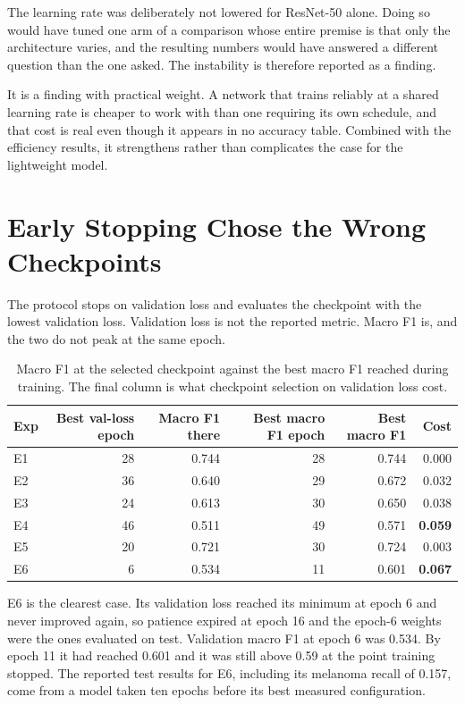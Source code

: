 The learning rate was deliberately not lowered for ResNet-50 alone. Doing so would have
tuned one arm of a comparison whose entire premise is that only the architecture varies,
and the resulting numbers would have answered a different question than the one asked.
The instability is therefore reported as a finding.

It is a finding with practical weight. A network that trains reliably at a shared
learning rate is cheaper to work with than one requiring its own schedule, and that cost
is real even though it appears in no accuracy table. Combined with the efficiency
results, it strengthens rather than complicates the case for the lightweight model.

\section{Early Stopping Chose the Wrong Checkpoints}
\label{sec:disc-earlystop}

The protocol stops on validation loss and evaluates the checkpoint with the lowest
validation loss. Validation loss is not the reported metric. Macro F1 is, and the two do
not peak at the same epoch.

\begin{table}[htbp]
\centering
\caption{Macro F1 at the selected checkpoint against the best macro F1 reached during
training. The final column is what checkpoint selection on validation loss cost.}
\label{tab:checkpoint-cost}
\small
\begin{tabular}{@{}lrrrrr@{}}
\toprule
\textbf{Exp} & \textbf{Best val-loss epoch} & \textbf{Macro F1 there} &
\textbf{Best macro F1 epoch} & \textbf{Best macro F1} & \textbf{Cost} \\
\midrule
E1 & 28 & 0.744 & 28 & 0.744 & 0.000 \\
E2 & 36 & 0.640 & 29 & 0.672 & 0.032 \\
E3 & 24 & 0.613 & 30 & 0.650 & 0.038 \\
E4 & 46 & 0.511 & 49 & 0.571 & \textbf{0.059} \\
E5 & 20 & 0.721 & 30 & 0.724 & 0.003 \\
E6 &  6 & 0.534 & 11 & 0.601 & \textbf{0.067} \\
\bottomrule
\end{tabular}
\end{table}

E6 is the clearest case. Its validation loss reached its minimum at epoch 6 and never
improved again, so patience expired at epoch 16 and the epoch-6 weights were the ones
evaluated on test. Validation macro F1 at epoch 6 was 0.534. By epoch 11 it had reached
0.601 and it was still above 0.59 at the point training stopped. The reported test
results for E6, including its melanoma recall of 0.157, come from a model taken ten
epochs before its best measured configuration.

